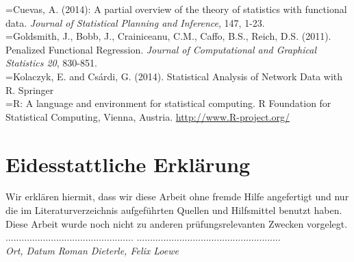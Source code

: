 \documentclass[a4paper,ngerman,oneside,titlepage,11pt]{scrreprt}
\theoremstyle{remark}
\begin{document}

\noindent \hangindent=\parindent [Cue14] Cuevas, A. (2014): A partial overview of the theory of statistics with functional data. \textit{Journal of Statistical Planning and Inference}, 147, 1-23.\\

\noindent \hangindent=\parindent [GBC+11] Goldsmith, J., Bobb, J., Crainiceanu, C.M., Caffo, B.S., Reich, D.S. (2011). Penalized Functional Regression. \textit{Journal of Computational and Graphical Statistics 20}, 830-851.\\

\noindent \hangindent=\parindent [KC14] Kolaczyk, E. and Csárdi, G. (2014). Statistical Analysis of Network Data with R. Springer\\

\noindent \hangindent=\parindent [R14] R: A language and environment for statistical computing. R Foundation for Statistical Computing, Vienna, Austria.
\url{http://www.R-project.org/}\\




\chapter*{Eidesstattliche Erklärung}

Wir erklären hiermit, dass wir diese Arbeit ohne fremde Hilfe angefertigt und nur die im Literaturverzeichnis aufgeführten Quellen und Hilfsmittel benutzt haben. Diese Arbeit wurde noch nicht zu anderen prüfungsrelevanten Zwecken vorgelegt.\\[1.5cm]




\noindent ................................................
\qquad\qquad\qquad\qquad\qquad
......................................................\\[0.5mm]
\textit{Ort, Datum}
\qquad\qquad\qquad\qquad\qquad\qquad\qquad\qquad\qquad
\textit{Roman Dieterle, Felix Loewe}
\end{document}
